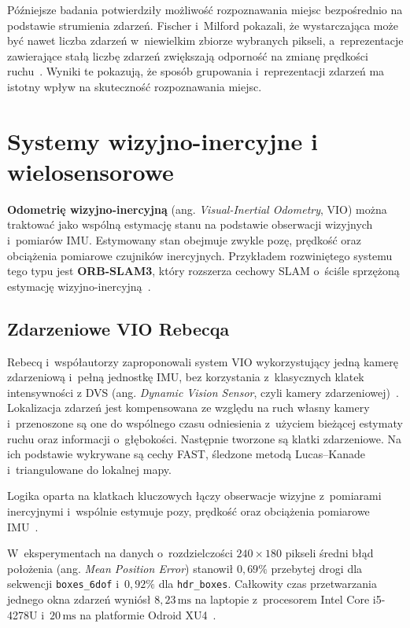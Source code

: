Późniejsze badania potwierdziły możliwość rozpoznawania miejsc bezpośrednio na podstawie strumienia zdarzeń. Fischer i~Milford pokazali, że wystarczająca może być nawet liczba zdarzeń w~niewielkim zbiorze wybranych pikseli, a~reprezentacje zawierające stałą liczbę zdarzeń zwiększają odporność na zmianę prędkości ruchu~\cite{fischer2022eventvpr}. Wyniki te pokazują, że sposób grupowania i~reprezentacji zdarzeń ma istotny wpływ na skuteczność rozpoznawania miejsc.

\section{Systemy wizyjno-inercyjne i wielosensorowe}
\label{sec:literatura_vio}


\textbf{Odometrię wizyjno-inercyjną} (ang. \textit{Visual-Inertial Odometry}, VIO) można traktować jako wspólną estymację stanu na podstawie obserwacji wizyjnych i~pomiarów IMU. Estymowany stan obejmuje zwykle pozę, prędkość oraz obciążenia pomiarowe czujników inercyjnych. Przykładem rozwiniętego systemu tego typu jest \textbf{ORB-SLAM3}, który rozszerza cechowy SLAM o~ściśle sprzężoną estymację wizyjno-inercyjną~\cite{campos2021orbslam3}.

\subsection{Zdarzeniowe VIO Rebecqa}
\label{subsec:event_vio}

Rebecq i~współautorzy zaproponowali system VIO wykorzystujący jedną kamerę zdarzeniową i~pełną jednostkę IMU, bez korzystania z~klasycznych klatek intensywności z DVS (ang. \textit{Dynamic Vision Sensor}, czyli kamery zdarzeniowej)~\cite{rebecq2017eventvio}. Lokalizacja zdarzeń jest kompensowana ze względu na  ruch własny kamery i~przenoszone są one do wspólnego czasu odniesienia z~użyciem bieżącej estymaty ruchu oraz informacji o~głębokości. Następnie tworzone są klatki zdarzeniowe. Na ich podstawie wykrywane są cechy FAST, śledzone metodą Lucas--Kanade i~triangulowane do lokalnej mapy.

Logika oparta na klatkach kluczowych łączy obserwacje wizyjne z~pomiarami inercyjnymi i~wspólnie estymuje pozy, prędkość oraz obciążenia pomiarowe IMU~\cite{rebecq2017eventvio}.

W~eksperymentach na danych o~rozdzielczości $240\times180$ pikseli średni błąd położenia (ang. \textit{Mean Position Error}) stanowił $0{,}69\%$ przebytej drogi dla sekwencji \texttt{boxes\_6dof} i~$0{,}92\%$ dla \texttt{hdr\_boxes}. Całkowity czas przetwarzania jednego okna zdarzeń wyniósł $8{,}23\,\mathrm{ms}$ na laptopie z~procesorem Intel Core i5-4278U i~$20\,\mathrm{ms}$ na platformie Odroid XU4~\cite{rebecq2017eventvio}.


